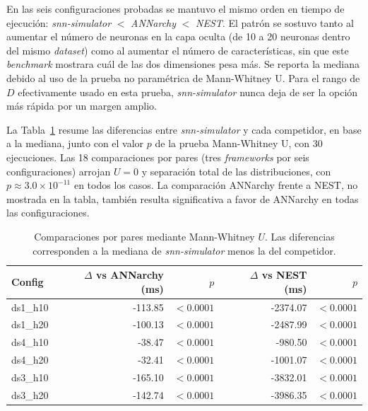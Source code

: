
En las seis configuraciones probadas se mantuvo el mismo orden en tiempo de ejecución: \textit{snn-simulator} \(<\) \textit{ANNarchy} \(<\) \textit{NEST}. El patrón se sostuvo tanto al aumentar el número de neuronas en la capa oculta (de 10 a 20 neuronas dentro del mismo \textit{dataset}) como al aumentar el número de características, sin que este \textit{benchmark} mostrara cuál de las dos dimensiones pesa más. Se reporta la mediana debido al uso de la prueba no paramétrica de Mann-Whitney U. Para el rango de $D$ efectivamente usado en esta prueba, \textit{snn-simulator} nunca deja de ser la opción más rápida por un margen amplio.



La Tabla~\ref{tab:framework-mannwhitney-res} resume las diferencias entre \textit{snn-simulator} y cada competidor, en base a la mediana, junto con el valor \(p\) de la prueba Mann-Whitney U, con 30 ejecuciones. Las 18 comparaciones por pares (tres \textit{frameworks} por seis configuraciones) arrojan \(U = 0\) y separación total de las distribuciones, con \(p \approx 3{.}0 \times 10^{-11}\) en todos los casos. La comparación ANNarchy frente a NEST, no mostrada en la tabla, también resulta significativa a favor de ANNarchy en todas las configuraciones.

\begin{table}[htbp]
\centering
\small
\caption{Comparaciones por pares mediante Mann-Whitney \(U\). Las diferencias corresponden a la mediana de \textit{snn-simulator} menos la del competidor.}
\label{tab:framework-mannwhitney-res}
\begin{tabular}{lrrrr}
\toprule
Config & $\Delta$ vs ANNarchy (ms) & $p$ & $\Delta$ vs NEST (ms) & $p$ \\
\midrule
ds1\_h10 & -113.85 & $<0.0001$ & -2374.07 & $<0.0001$ \\
ds1\_h20 & -100.13 & $<0.0001$ & -2487.99 & $<0.0001$ \\
ds4\_h10 &  -38.47 & $<0.0001$ &  -980.50 & $<0.0001$ \\
ds4\_h20 &  -32.41 & $<0.0001$ & -1001.07 & $<0.0001$ \\
ds3\_h10 & -165.10 & $<0.0001$ & -3832.01 & $<0.0001$ \\
ds3\_h20 & -142.74 & $<0.0001$ & -3986.35 & $<0.0001$ \\
\bottomrule
\end{tabular}
\end{table}

